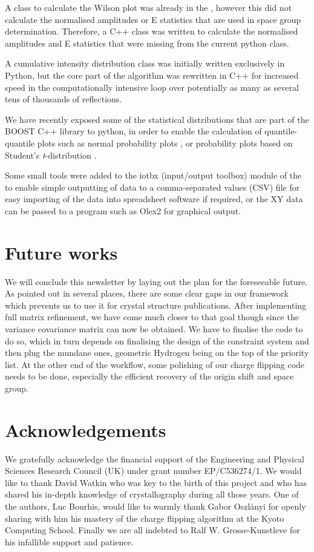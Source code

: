 \documentclass[12pt]{article}
\begin{document}
A class to calculate the Wilson plot was already in the \cctbx, however this did not calculate the normalised amplitudes or E statistics that are used in space group determination. Therefore, a C++ class was written to calculate the normalised amplitudes and E statistics that were missing from the current python class.

A cumulative intensity distribution class \cite{Howells:1950} was initially written exclusively in Python, but the core part of the algorithm was rewritten in C++ for increased speed in the computationally intensive loop over potentially as many as several tens of thousands of reflections.

We have recently exposed some of the statistical distributions that are part of the BOOST C++ library \cite{boostcpp} to python, in order to enable the calculation of quantile-quantile plots such as normal probability plots \cite{Abrahams:1971}, or probability plots based on Student's \textit{t}-distribution \cite{Hooft:2009}.

Some small tools were added to the iotbx (input/output toolbox) module of the \cctbx to enable simple outputting of data to a comma-separated values (CSV) file for easy importing of the data into spreadsheet software if required, or the XY data can be passed to a program such as Olex2 \cite{Dolomanov:2009} for graphical output.


\section{Future works}

We will conclude this newsletter by laying out the plan for the foreseeable future. As pointed out in several places, there are some clear gaps in our framework which prevents us to use it for crystal structure publications. After implementing full matrix refinement, we have come much closer to that goal though since the variance covariance matrix can now be obtained. We have to finalise the code to do so, which in turn depends on finalising the design of the constraint system and then plug the mundane ones, geometric Hydrogen being on the top of the priority list. At the other end of the workflow, some polishing of our charge flipping code needs to be done, especially the efficient recovery of the origin shift and space group.


\section*{Acknowledgements}
We gratefully acknowledge the financial support of the Engineering and Physical Sciences Research Council (UK) under grant number EP/C536274/1. We would like to thank David Watkin who was key to the birth of this project and who has shared his in-depth knowledge of crystallography during all those years. One of the authors, Luc Bourhis, would like to warmly thank Gabor Oszlányi for openly sharing with him his mastery of the charge flipping algorithm at the Kyoto Computing School. Finally we are all indebted to Ralf W. Grosse-Kunstleve for his infallible support and patience.


\end{document}
